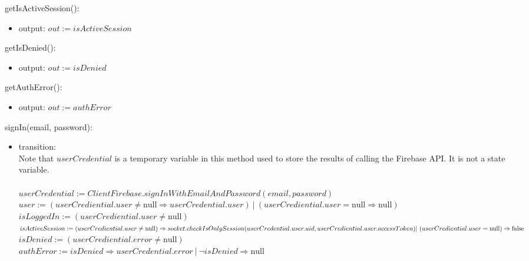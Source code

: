 \documentclass[12pt, titlepage]{article}
\begin{document}
\noindent getIsActiveSession():
\begin{itemize}
\item output: $out := isActiveSession$
\end{itemize}

\noindent getIsDenied():
\begin{itemize}
\item output: $out := isDenied$
\end{itemize}

\noindent getAuthError():
\begin{itemize}
\item output: $out := authError$
\end{itemize}

\noindent signIn(email, password):
\begin{itemize}
\item transition: \\
Note that $userCredential$ is a temporary variable in this method used to store the results of calling the Firebase API. It is not a state variable. \\ \\
$userCredential :=  ClientFirebase.signInWithEmailAndPassword(email, password)$ \\

$user := (userCrediential.user \neq \text{null} \Rightarrow userCredential.user) \ | \ (userCrediential.user = \text{null} \Rightarrow \text{null})$ \\

$isLoggedIn := (userCrediential.user \neq \text{null})$ \\

$isActiveSession := \\ (userCrediential.user \neq \text{null}) \\ \Rightarrow socket.checkIsOnlySession(userCredential.user.uid, userCrediential.user.accessToken) \\
| \ (userCrediential.user = \text{null}) \Rightarrow \text {false}$ \\

$isDenied := (userCrediential.error \neq \text{null})$ \\

$authError := isDenied \Rightarrow userCredential.error \ | \ \lnot isDenied \Rightarrow \text{null} $

\end{itemize}
\end{document}
